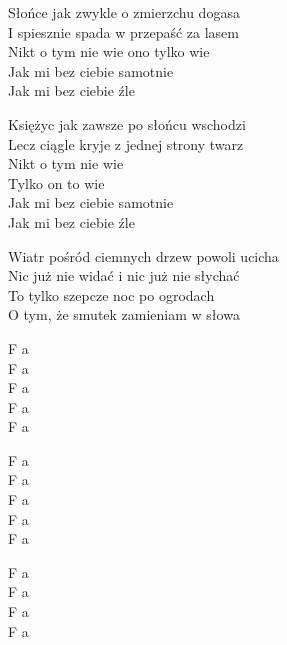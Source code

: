 \begin{text}
    Słońce jak zwykle o zmierzchu dogasa\\
    I spiesznie spada w przepaść za lasem\\
    Nikt o tym nie wie ono tylko wie\\
    Jak mi bez ciebie samotnie\\
    Jak mi bez ciebie źle

    Księżyc jak zawsze po słońcu wschodzi\\
    Lecz ciągle kryje z jednej strony twarz\\
    Nikt o tym nie wie\\
    Tylko on to wie\\
    Jak mi bez ciebie samotnie\\
    Jak mi bez ciebie źle

    Wiatr pośród ciemnych drzew powoli ucicha\\
    Nic już nie widać i nic już nie słychać\\
    To tylko szepcze noc po ogrodach\\
    O tym, że smutek zamieniam w słowa
\end{text}
\begin{chord}
    F a\\
    F a\\
    F a\\
    F a\\
    F a

    F a\\
    F a\\
    F a\\
    F a\\
    F a

    F a\\
    F a\\
    F a\\
    F a
\end{chord}